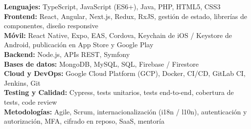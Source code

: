 \documentclass[9pt]{developercv} %
\begin{document}


\textbf{Lenguajes:} TypeScript, JavaScript (ES6+), Java, PHP, HTML5, CSS3\\
\textbf{Frontend:} React, Angular, Next.js, Redux, RxJS, gestión de estado, librerías de componentes, diseño responsive\\
\textbf{Móvil:} React Native, Expo, EAS, Cordova, Keychain de iOS / Keystore de Android, publicación en App Store y Google Play\\
\textbf{Backend:} Node.js, APIs REST, Symfony\\
\textbf{Bases de datos:} MongoDB, MySQL, SQL, Firebase / Firestore\\
\textbf{Cloud y DevOps:} Google Cloud Platform (GCP), Docker, CI/CD, GitLab CI, Jenkins, Git\\
\textbf{Testing y Calidad:} Cypress, tests unitarios, tests end-to-end, cobertura de tests, code review\\
\textbf{Metodologías:} Agile, Scrum, internacionalización (i18n / l10n), autenticación y autorización, MFA, cifrado en reposo, SaaS, mentoría

\end{document}
